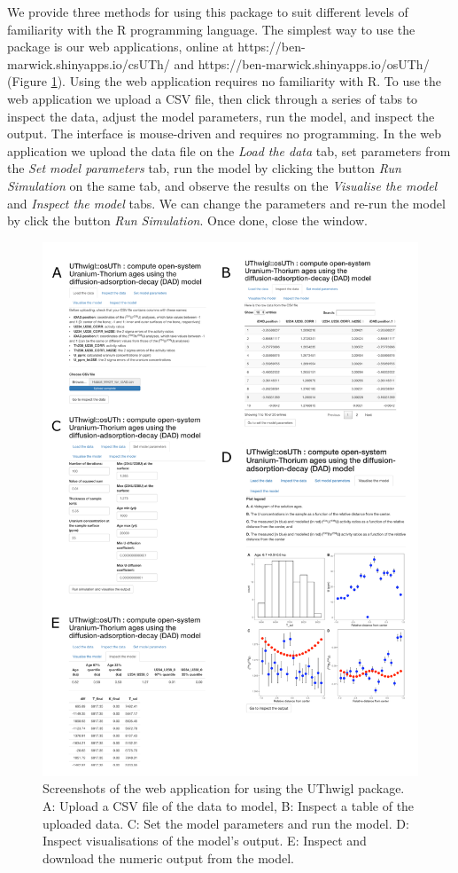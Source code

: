 \documentclass[]{elsarticle} %
\begin{document}
We provide three methods for using this package to suit different levels of familiarity with the R programming language. The simplest way to use the package is our web applications, online at https://ben-marwick.shinyapps.io/csUTh/ and https://ben-marwick.shinyapps.io/osUTh/ (Figure \ref{fig:shinyfig}). Using the web application requires no familiarity with R. To use the web application we upload a CSV file, then click through a series of tabs to inspect the data, adjust the model parameters, run the model, and inspect the output. The interface is mouse-driven and requires no programming. In the web application we upload the data file on the \emph{Load the data} tab, set parameters from the \emph{Set model parameters} tab, run the model by clicking the button \emph{Run Simulation} on the same tab, and observe the results on the \emph{Visualise the model} and \emph{Inspect the model} tabs. We can change the parameters and re-run the model by click the button \emph{Run Simulation}. Once done, close the window.



\begin{figure}
\includegraphics[width=0.95\linewidth]{figures/shiny-app-screenshots} \caption{Screenshots of the web application for using the UThwigl package. A: Upload a CSV file of the data to model, B: Inspect a table of the uploaded data. C: Set the model parameters and run the model. D: Inspect visualisations of the model's output. E: Inspect and download the numeric output from the model.}\label{fig:shinyfig}
\end{figure}
\end{document}

